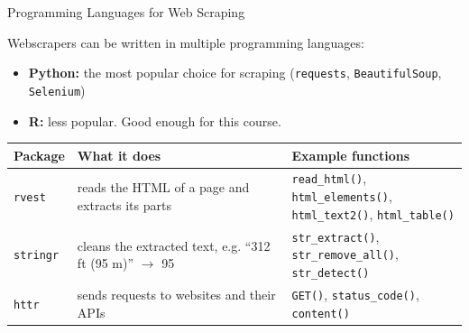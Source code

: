 \documentclass[9pt,aspectratio=169]{beamer}
\begin{document}
\begin{frame}[fragile]{Programming Languages for Web Scraping}
\linespread{1.3}\selectfont %

Webscrapers can be written in multiple programming languages:
\begin{itemize}
  \item \textbf{Python:} the most popular choice for scraping (\texttt{requests}, \texttt{BeautifulSoup}, \texttt{Selenium})
  \item \textbf{R:} less popular. Good enough for this course.
\end{itemize}

\pause
\vspace{5mm}
\begin{center}
\scriptsize
\begin{tabular}{lll}
\toprule
\textbf{Package} & \textbf{What it does} & \textbf{Example functions} \\
\midrule
\texttt{rvest} & reads the HTML of a page and extracts its parts & \makecell[l]{\texttt{read\_html()}, \texttt{html\_elements()},\\ \texttt{html\_text2()}, \texttt{html\_table()}} \\
\texttt{stringr} & cleans the extracted text, e.g. ``312 ft (95 m)'' $\rightarrow$ 95 & \makecell[l]{\texttt{str\_extract()}, \texttt{str\_remove\_all()},\\ \texttt{str\_detect()}} \\
\texttt{httr} & sends requests to websites and their APIs & \texttt{GET()}, \texttt{status\_code()}, \texttt{content()} \\
\bottomrule
\end{tabular}
\end{center}

\end{frame}
\end{document}
